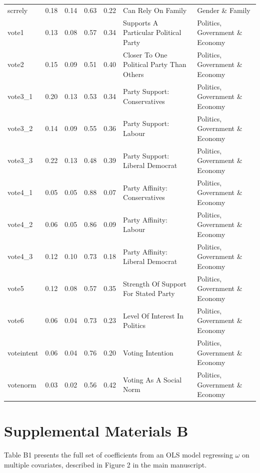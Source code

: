\documentclass[
  12pt,
]{article}
\begin{document}
\begin{landscape}
\begin{scriptsize}
\begin{longtable}{|p{1.75in}|p{0.3in}|p{0.3in}|p{0.3in}|p{0.3in}|p{2.5in}|p{2.5in}}
scrrely & 0.18 & 0.14 & 0.63 & 0.22 & Can Rely On Family & Gender \& Family \\ 
vote1 & 0.13 & 0.08 & 0.57 & 0.34 & Supports A Particular Political Party & Politics, Government \& Economy \\ 
vote2 & 0.15 & 0.09 & 0.51 & 0.40 & Closer To One Political Party Than Others & Politics, Government \& Economy \\ 
vote3\_1 & 0.20 & 0.13 & 0.53 & 0.34 & Party Support: Conservatives & Politics, Government \& Economy \\ 
vote3\_2 & 0.14 & 0.09 & 0.55 & 0.36 & Party Support: Labour & Politics, Government \& Economy \\ 
vote3\_3 & 0.22 & 0.13 & 0.48 & 0.39 & Party Support: Liberal Democrat & Politics, Government \& Economy \\ 
vote4\_1 & 0.05 & 0.05 & 0.88 & 0.07 & Party Affinity: Conservatives & Politics, Government \& Economy \\ 
vote4\_2 & 0.06 & 0.05 & 0.86 & 0.09 & Party Affinity: Labour & Politics, Government \& Economy \\ 
vote4\_3 & 0.12 & 0.10 & 0.73 & 0.18 & Party Affinity: Liberal Democrat & Politics, Government \& Economy \\ 
vote5 & 0.12 & 0.08 & 0.57 & 0.35 & Strength Of Support For Stated Party & Politics, Government \& Economy \\ 
vote6 & 0.06 & 0.04 & 0.73 & 0.23 & Level Of Interest In Politics & Politics, Government \& Economy \\ 
voteintent & 0.06 & 0.04 & 0.76 & 0.20 & Voting Intention & Politics, Government \& Economy \\ 
votenorm & 0.03 & 0.02 & 0.56 & 0.42 & Voting As A Social Norm & Politics, Government \& Economy \\ 
\bottomrule
\end{longtable}
\end{scriptsize}

\end{landscape}
\newpage

\hypertarget{supplemental-materials-b}{%
\section{Supplemental Materials B}\label{supplemental-materials-b}}

Table B1 presents the full set of coefficients from an OLS model
regressing \(\omega\) on multiple covariates, described in Figure 2 in
the main manuscript.
\end{document}
